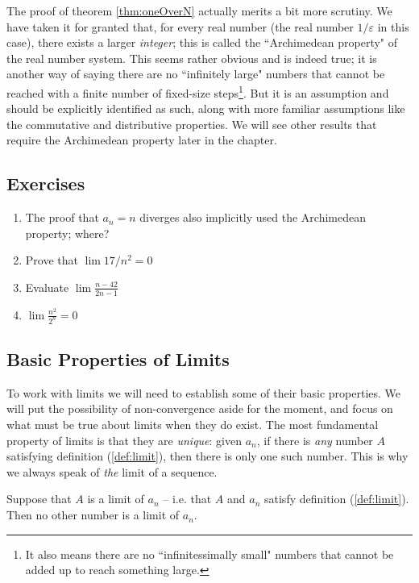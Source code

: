 The proof of theorem \ref{thm:oneOverN} actually merits a bit more scrutiny.
We have taken it for granted that, for every real number (the real number $1/\varepsilon$ in this case), there exists a larger \emph{integer}; this is called the ``Archimedean property" of the real number system.
This seems rather obvious and is indeed true; it is another way of saying there are no ``infinitely large" numbers that cannot be reached with a finite number of fixed-size steps\footnote{It also means there are no ``infinitessimally small" numbers that cannot be added up to reach something large.}. 
But it is an assumption and should be explicitly identified as such, along with more familiar assumptions like the commutative and distributive properties. We will see other results that require the Archimedean property later in the chapter.

\subsection{Exercises}
\begin{enumerate}
\item The proof that $a_n=n$ diverges also implicitly used the Archimedean property; where?
\item Prove that $\lim 17/n^2 = 0$
\item Evaluate $\lim \frac{n-42}{2n-1}$%
\item $\lim \frac{n^2}{2^n} = 0$
\end{enumerate}


\subsection{Basic Properties of Limits}
To work with limits we will need to establish some of their  basic properties. We will put the possibility of non-convergence aside for the moment, and focus on what must be true about limits when they do exist. The most fundamental property of limits is that they are \emph{unique}: given $a_n$, if there is \emph{any} number $A$ satisfying definition (\ref{def:limit}), then there is only one such number. This is why we always speak of \emph{the} limit of a sequence. 

\begin{thm}\label{thm:uniqueness}
Suppose that $A$ is a limit of $a_n$ -- i.e. that $A$ and $a_n$ satisfy definition (\ref{def:limit}). Then no other number is a limit  of $a_n$.\end{thm}

